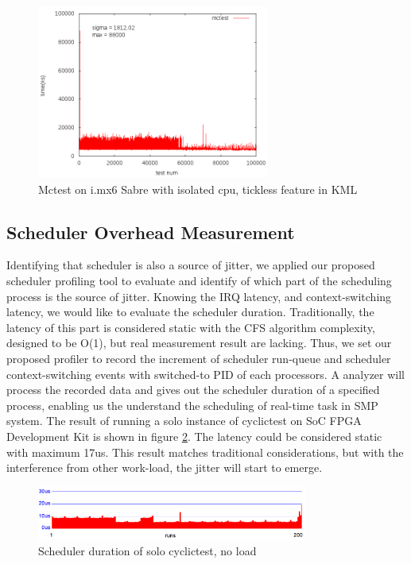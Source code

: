 \documentclass[conference]{IEEEtran}
\begin{document}
    \begin{figure} \centering \includegraphics[width=3in]{img/mctest-kml.png} \caption{Mctest on i.mx6 Sabre with
    isolated cpu, tickless feature in KML} \label{fig:imx6_mctest_kml} \end{figure}
    
\subsection{Scheduler Overhead Measurement}
    
    Identifying that scheduler is also a source of jitter, we applied our proposed scheduler profiling tool to evaluate
    and identify of which part of the scheduling process is the source of jitter. Knowing the IRQ latency, and
    context-switching latency, we would like to evaluate the scheduler duration. Traditionally, the latency of this part
    is considered static with the CFS algorithm complexity, designed to be O(1), but real measurement result are
    lacking. Thus, we set our proposed profiler to record the increment of scheduler run-queue and scheduler
    context-switching events with switched-to PID of each processors. A analyzer will process the recorded data and
    gives out the scheduler duration of a specified process, enabling us the understand the scheduling of real-time task
    in SMP system. The result of running a solo instance of cyclictest on SoC FPGA Development Kit is shown in figure
    \ref{fig:sd_solo}. The latency could be considered static with maximum 17us. This result matches traditional
    considerations, but with the interference from other work-load, the jitter will start to emerge.

    \begin{figure} \centering \includegraphics[width=3.5in]{img/sd-solo.png} \caption{Scheduler duration of solo
    cyclictest, no load} \label{fig:sd_solo} \end{figure}
\end{document}
